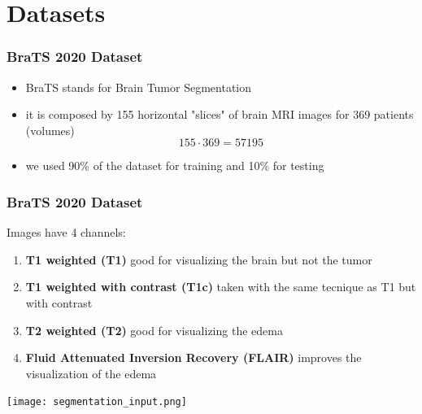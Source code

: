 \documentclass[../presentation.tex]{subfiles} %
\begin{document}
\section{Datasets} %

\begin{frame}

	\frametitle{BraTS 2020 Dataset}
    \begin{itemize}
        \item BraTS stands for Brain Tumor Segmentation
        \item it is composed by 155 horizontal "slices" of brain MRI images for 369 patients (volumes) 
        \[155 \cdot 369 = 57195 \]
        \item we used 90\% of the dataset for training and 10\% for testing
    \end{itemize}

\end{frame}

\begin{frame}
    \frametitle{BraTS 2020 Dataset}
    Images have 4 channels:
        \begin{enumerate}
            \item \textbf{T1 weighted (T1)} good for visualizing the brain but not the tumor
            \item \textbf{T1 weighted with contrast (T1c)} taken with the same tecnique as T1 but with contrast
            \item \textbf{T2 weighted (T2)} good for visualizing the edema
            \item \textbf{Fluid Attenuated Inversion Recovery (FLAIR)} improves the visualization of the edema
        \end{enumerate}
        \begin{center}
            \texttt{[image: segmentation\_input.png]}
        \end{center}
\end{frame}
\end{document}
